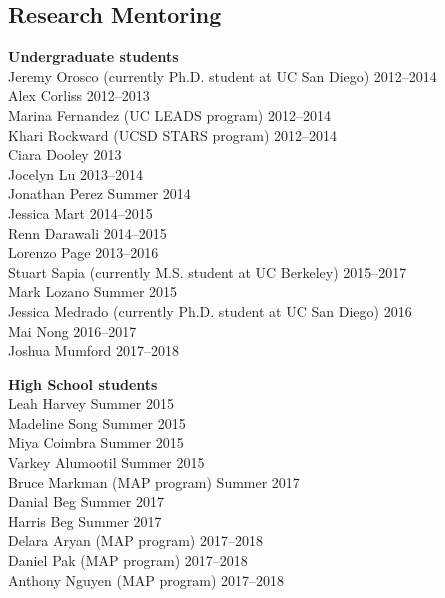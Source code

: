 \documentclass[10pt]{res}
\begin{document}
\begin{resume}
\section{Research Mentoring}
\vspace{0.1in}

\textbf{Undergraduate students} \\
Jeremy Orosco (currently Ph.D. student at UC San Diego) \hfill 2012--2014 \\
Alex Corliss \hfill 2012--2013 \\
Marina Fernandez (UC LEADS program) \hfill 2012--2014 \\
Khari Rockward (UCSD STARS program) \hfill 2012--2014 \\
Ciara Dooley \hfill 2013 \\
Jocelyn Lu \hfill 2013--2014 \\
Jonathan Perez \hfill Summer 2014 \\
Jessica Mart \hfill 2014--2015 \\
Renn Darawali \hfill 2014--2015 \\
Lorenzo Page \hfill 2013--2016 \\
Stuart Sapia (currently M.S. student at UC Berkeley) \hfill 2015--2017 \\
Mark Lozano \hfill Summer 2015 \\
Jessica Medrado (currently Ph.D. student at UC San Diego) \hfill 2016 \\
Mai Nong \hfill 2016--2017 \\
Joshua Mumford \hfill 2017--2018


\textbf{High School students} \\
Leah Harvey \hfill Summer 2015 \\
Madeline Song \hfill Summer 2015 \\
Miya Coimbra \hfill Summer 2015 \\
Varkey Alumootil \hfill Summer 2015 \\
Bruce Markman (MAP program) \hfill Summer 2017 \\
Danial Beg \hfill Summer 2017 \\
Harris Beg \hfill Summer 2017 \\
Delara Aryan (MAP program) \hfill 2017--2018 \\
Daniel Pak (MAP program) \hfill 2017--2018 \\
Anthony Nguyen (MAP program) \hfill 2017--2018




\end{resume}
\end{document}
